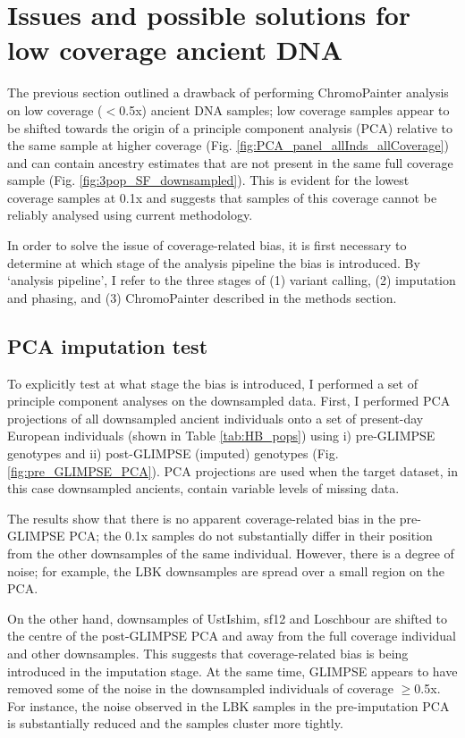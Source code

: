 {\section{Issues and possible solutions for low coverage ancient DNA}

The previous section outlined a drawback of performing ChromoPainter analysis on low coverage ($<$0.5x) ancient DNA samples; low coverage samples appear to be shifted towards the origin of a principle component analysis (PCA) relative to the same sample at higher coverage (Fig. \ref{fig:PCA_panel_allInds_allCoverage}) and can contain ancestry estimates that are not present in the same full coverage sample (Fig. \ref{fig:3pop_SF_downsampled}).  This is evident for the lowest coverage samples at 0.1x and suggests that samples of this coverage cannot be reliably analysed using         current methodology.

In order to solve the issue of coverage-related bias, it is first necessary to determine at which stage of the analysis pipeline the bias is introduced. By `analysis pipeline', I refer to the three stages of (1) variant calling, (2) imputation and phasing, and (3) ChromoPainter described in the methods section.

\subsection{PCA imputation test} \label{sec:PCAImputationTest}

To explicitly test at what stage the bias is introduced, I performed a set of principle component analyses on the downsampled data. First, I performed PCA projections of all downsampled ancient individuals onto a set of present-day European individuals (shown in Table \ref{tab:HB_pops}) using i) pre-GLIMPSE genotypes and ii) post-GLIMPSE (imputed) genotypes (Fig. \ref{fig:pre_GLIMPSE_PCA}). PCA projections are used when the target dataset, in this case downsampled ancients, contain variable levels of missing data.  

The results show that there is no apparent coverage-related bias in the pre-GLIMPSE PCA; the 0.1x samples do not substantially differ in their position from the other downsamples of the same individual. However, there is a degree of noise; for example, the LBK downsamples are spread over a small region on the PCA. 

On the other hand, downsamples of UstIshim, sf12 and Loschbour are shifted to the centre of the post-GLIMPSE PCA and away from the full coverage individual and other downsamples. This suggests that coverage-related bias is being introduced in the imputation stage. At the same time, GLIMPSE appears to have removed some of the noise in the downsampled individuals of coverage $\geq$0.5x. For instance, the noise observed in the LBK samples in the pre-imputation PCA is substantially reduced and the samples cluster more tightly.  

}
